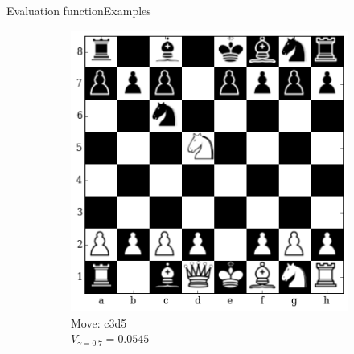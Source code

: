 \documentclass[9pt, unknownkeysallowed]{beamer}
\begin{document}
\begin{frame}{Evaluation function}{Examples}
{\begin{figure}[H]
\begin{subfigure}[t]{0.3\textwidth}
    \includegraphics[width=\textwidth]{../img/table_evaluations/output_11_2.png}
        \caption{Move: c3d5\\
        $V_{\gamma=0.7}=0.0545$}
    \end{subfigure}
   ~
    \begin{subfigure}[t]{0.3\textwidth}
        \centering
        

\end{subfigure}
\end{figure}}
\end{frame}
\end{document}
